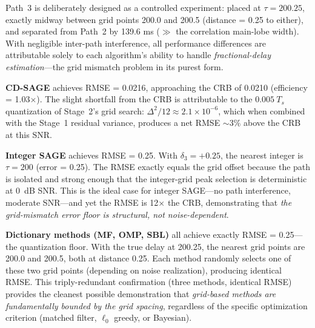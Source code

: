 \documentclass[a4paper,fleqn]{cas-dc}
\begin{document}
Path~3 is deliberately designed as a controlled experiment: placed at $\tau = 200.25$, exactly midway between grid points 200.0 and 200.5 (distance = 0.25 to either), and separated from Path~2 by 139.6 ms ($\gg$ the correlation main-lobe width). With negligible inter-path interference, all performance differences are attributable solely to each algorithm's ability to handle \textit{fractional-delay estimation}---the grid mismatch problem in its purest form.

\textbf{CD-SAGE} achieves RMSE = 0.0216, approaching the CRB of 0.0210 (efficiency = 1.03$\times$). The slight shortfall from the CRB is attributable to the $0.005\ T_s$ quantization of Stage~2's grid search: $\Delta^2/12 \approx 2.1\times 10^{-6}$, which when combined with the Stage~1 residual variance, produces a net RMSE $\sim 3\%$ above the CRB at this SNR.

\textbf{Integer SAGE} achieves RMSE = 0.25. With $\delta_3 = +0.25$, the nearest integer is $\tau = 200$ (error = 0.25). The RMSE exactly equals the grid offset because the path is isolated and strong enough that the integer-grid peak selection is deterministic at 0~dB SNR. This is the ideal case for integer SAGE---no path interference, moderate SNR---and yet the RMSE is 12$\times$ the CRB, demonstrating that \textit{the grid-mismatch error floor is structural, not noise-dependent}.

\textbf{Dictionary methods (MF, OMP, SBL)} all achieve exactly RMSE = 0.25---the quantization floor. With the true delay at 200.25, the nearest grid points are 200.0 and 200.5, both at distance 0.25. Each method randomly selects one of these two grid points (depending on noise realization), producing identical RMSE. This triply-redundant confirmation (three methods, identical RMSE) provides the cleanest possible demonstration that \textit{grid-based methods are fundamentally bounded by the grid spacing}, regardless of the specific optimization criterion (matched filter, $\ell_0$ greedy, or Bayesian).
\end{document}
